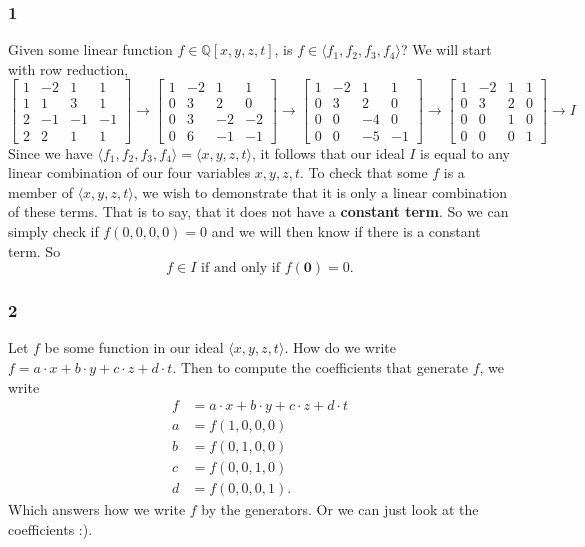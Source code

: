 \documentclass{article}
\theoremstyle{definition}
\begin{document}
\subsubsection*{1}
Given some linear function $f \in \mathbb{Q}[x,y,z,t]$, is $f \in \langle f_1,f_2,f_3,f_4\rangle$?
We will start with row reduction,
\[
    \begin{bmatrix}
        1 & -2 & 1 & 1 \\
        1 & 1 & 3 & 1 \\
        2 & -1 & -1 & -1 \\
        2 & 2 & 1 & 1
    \end{bmatrix}   
    \to 
    \begin{bmatrix}
        1 & -2 & 1 & 1 \\
        0 & 3 & 2 & 0 \\
        0 & 3 & -2 & -2 \\
        0 & 6 & -1 & -1
    \end{bmatrix} 
    \to 
    \begin{bmatrix}
        1 & -2 & 1 & 1 \\
        0 & 3 & 2 & 0 \\
        0 & 0 & -4 & 0 \\
        0 & 0 & -5 & -1 
    \end{bmatrix}
    \to 
    \begin{bmatrix}
        1 & -2 & 1 & 1 \\
        0 & 3 & 2 & 0 \\
        0 & 0 & 1 & 0 \\
        0 & 0 & 0 & 1 
    \end{bmatrix}
    \to 
    I
\]
Since we have $\langle f_1, f_2, f_3, f_4\rangle = \langle x,y,z,t\rangle$,
it follows that our ideal $I$ is equal to any linear combination of our four variables 
$x,y,z,t$. To check that some $f$ is a member of $\langle x,y,z,t \rangle$,
we wish to demonstrate that it is only a linear combination of these terms. 
That is to say, that it does not have a \textbf{constant term}. So we can simply 
check if $f(0,0,0,0) = 0$ and we will then know if there is a constant term. So 
\[
    f \in I \text{ if and only if } f(\bm 0) = 0  
.\]
\subsubsection*{2}
Let $f$ be some function in our ideal $\langle x,y,z,t\rangle$.
How do we write $f = a\cdot x + b \cdot y + c \cdot z + d \cdot t$.
Then to compute the coefficients that generate $f$, we write 
\begin{align*}
    f &= a\cdot x + b \cdot y + c \cdot z + d \cdot t \\
    a &= f(1,0,0,0) \\
    b &= f(0,1,0,0) \\
    c &= f(0,0,1,0) \\
    d &= f(0,0,0,1)
.\end{align*}
Which answers how we write $f$ by the generators. Or we can just look at the coefficients :).
\end{document}
